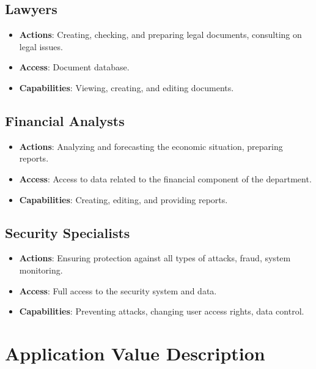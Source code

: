 \documentclass[20pt]{article}
\begin{document}
\subsection{Lawyers}
\begin{itemize}
    \item \textbf{Actions}: Creating, checking, and preparing legal documents, consulting on legal issues.
    \item \textbf{Access}: Document database.
    \item \textbf{Capabilities}: Viewing, creating, and editing documents.
\end{itemize}

\subsection{Financial Analysts}
\begin{itemize}
    \item \textbf{Actions}: Analyzing and forecasting the economic situation, preparing reports.
    \item \textbf{Access}: Access to data related to the financial component of the department.
    \item \textbf{Capabilities}: Creating, editing, and providing reports.
\end{itemize}

\subsection{Security Specialists}
\begin{itemize}
    \item \textbf{Actions}: Ensuring protection against all types of attacks, fraud, system monitoring.
    \item \textbf{Access}: Full access to the security system and data.
    \item \textbf{Capabilities}: Preventing attacks, changing user access rights, data control.
\end{itemize}

\section{Application Value Description}
\end{document}
